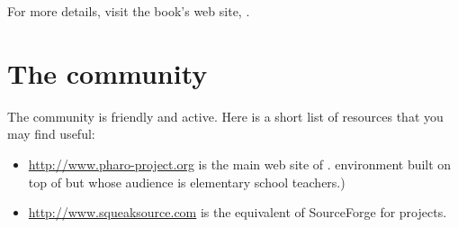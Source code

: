 \documentclass[a4paper,10pt,twoside]{book}
\begin{document}
For more details, visit the book's web site, \pbe. 

\section*{The \pharo community}

The \pharo community is friendly and active.
Here is a short list of resources that you may find useful:

\begin{itemize}
\item \url{http://www.pharo-project.org} is the main web site of \pharo.
environment built on top of \pharo but whose audience is elementary school teachers.)

\item \url{http://www.squeaksource.com} is the equivalent of SourceForge for \pharo projects.
\end{itemize}





\end{document}
